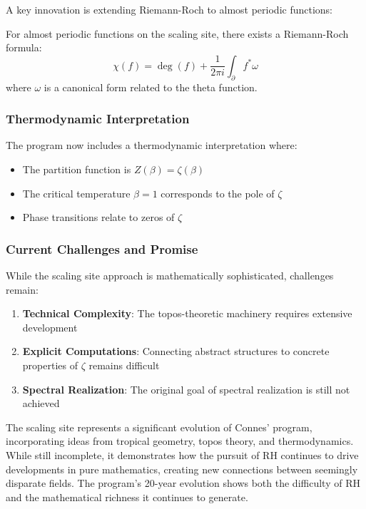 A key innovation is extending Riemann-Roch to almost periodic functions:

\begin{theorem}
\label{thm:rr_ap}
For almost periodic functions on the scaling site, there exists a Riemann-Roch formula:
\begin{equation}
\chi(f) = \deg(f) + \frac{1}{2\pi i} \int_{\partial} f^* \omega
\end{equation}
where $\omega$ is a canonical form related to the theta function.
\end{theorem}

\subsubsection{Thermodynamic Interpretation}

The program now includes a thermodynamic interpretation where:
\begin{itemize}
\item The partition function is $Z(\beta) = \zeta(\beta)$
\item The critical temperature $\beta = 1$ corresponds to the pole of $\zeta$
\item Phase transitions relate to zeros of $\zeta$
\end{itemize}

\subsubsection{Current Challenges and Promise}

While the scaling site approach is mathematically sophisticated, challenges remain:

\begin{enumerate}
\item \textbf{Technical Complexity}: The topos-theoretic machinery requires extensive development
\item \textbf{Explicit Computations}: Connecting abstract structures to concrete properties of $\zeta$ remains difficult
\item \textbf{Spectral Realization}: The original goal of spectral realization is still not achieved
\end{enumerate}

\begin{remark}
The scaling site represents a significant evolution of Connes' program, incorporating ideas from tropical geometry, topos theory, and thermodynamics. While still incomplete, it demonstrates how the pursuit of RH continues to drive developments in pure mathematics, creating new connections between seemingly disparate fields. The program's 20-year evolution shows both the difficulty of RH and the mathematical richness it continues to generate.
\end{remark}

